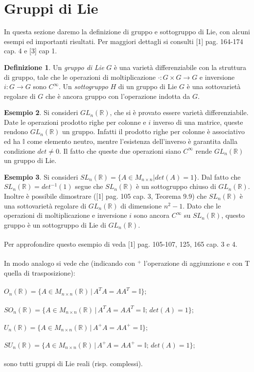 \documentclass[12pt,a4paper]{report}
\theoremstyle{definition}
\newtheorem{Def}{Definizione}[chapter]
\theoremstyle{Theorem}
\theoremstyle{definition}
\newtheorem{Ex}[Def]{Esempio}
\theoremstyle{definition}
\theoremstyle{definition}
\begin{document}
\section{Gruppi di Lie}
In questa sezione daremo la definizione di gruppo e sottogruppo di Lie, con alcuni esempi ed importanti risultati. Per maggiori dettagli si consulti [1] pag. 164-174 cap. 4 e [3] cap 1.
\begin{Def}
	Un \textit{gruppo di Lie} $G$ è una varietà differenziabile con la struttura di gruppo, tale che le operazioni di moltiplicazione $\cdot:G\times G\rightarrow G$ e inversione $i:G\rightarrow G$ sono $C^\infty$.
	Un \textit{sottogruppo} $H$ di un gruppo di Lie $G$ è una sottovarietà regolare di $G$ che è ancora gruppo con l'operazione indotta da $G$.
\end{Def}
\begin{Ex}
	Si consideri $GL_n(\mathbb{R})$, che si è provato essere varietà differenziabile. Date le operazioni prodotto righe per colonne e $i$ inverso di una matrice, queste rendono $GL_n(\mathbb{R})$ un gruppo. Infatti il prodotto righe per colonne è associativo ed ha $\mathbb{I}$ come elemento neutro, mentre l'esistenza dell'inverso è garantita dalla condizione $det\neq 0$. Il fatto che queste due operazioni siano $C^\infty$ rende $GL_n(\mathbb{R})$ un gruppo di Lie.
\end{Ex}
\begin{Ex}
	Si consideri $SL_n(\mathbb{R})=\{A\in M_{n\times n}| det(A)=1\}$. Dal fatto che $SL_n(\mathbb{R})=det^{-1}(1)$ segue che $SL_n(\mathbb{R})$ è un sottogruppo chiuso di $GL_n(\mathbb{R})$. Inoltre è possibile dimostrare ([1] pag. 105 cap. 3, Teorema 9.9) che $SL_n(\mathbb{R})$ è una sottovarietà regolare di $GL_n(\mathbb{R})$ di dimensione $n^2-1$. Dato che le operazioni di moltiplicazione e inversione $i$ sono ancora $C^\infty$ su $SL_n(\mathbb{R})$, questo gruppo è un sottogruppo di Lie di $GL_n(\mathbb{R})$.\\
	\\
	Per approfondire questo esempio di veda [1] pag. 105-107, 125, 165 cap. 3 e 4.\\
	\\
	In modo analogo si vede che (indicando con $^+$ l'operazione di aggiunzione e con T quella di trasposizione):\\\\
	$O_n(\mathbb{R})=\{A\in M_{n\times n}(\mathbb{R})\, |\, A^TA=AA^T=\mathbb{I}\};$\\\\
	$SO_n(\mathbb{R})=\{A\in M_{n\times n}(\mathbb{R})\, |\, A^TA=AA^T=\mathbb{I};\, det(A)=1\};$\\\\
	$U_n(\mathbb{R})=\{A\in M_{n\times n}(\mathbb{R})\, |\, A^+A=AA^+=\mathbb{I}\};$\\\\
	$SU_n(\mathbb{R})=\{A\in M_{n\times n}(\mathbb{R})\, |\, A^+A=AA^+=\mathbb{I};\,det(A)=1\};$\\\\
	sono tutti gruppi di Lie reali (risp. complessi). 
\end{Ex}
\end{document}
